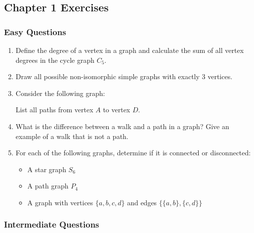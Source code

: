 \documentclass{article}
\theoremstyle{definition}
\begin{document}
\newpage
\subsection{Chapter 1 Exercises}

\subsubsection{Easy Questions}

\begin{enumerate}
\item Define the degree of a vertex in a graph and calculate the sum of all vertex degrees in the cycle graph $C_5$.

\item Draw all possible non-isomorphic simple graphs with exactly 3 vertices.

\item Consider the following graph:
\begin{center}
\end{center}
List all paths from vertex $A$ to vertex $D$.

\item What is the difference between a walk and a path in a graph? Give an example of a walk that is not a path.

\item For each of the following graphs, determine if it is connected or disconnected:
\begin{itemize}
    \item A star graph $S_6$
    \item A path graph $P_4$
    \item A graph with vertices $\{a,b,c,d\}$ and edges $\{\{a,b\}, \{c,d\}\}$
\end{itemize}
\end{enumerate}

\subsubsection{Intermediate Questions}
\end{document}
